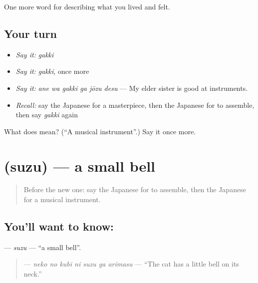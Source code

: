 \begin{grammarlens}[title={What you've built}]
One more word for describing what you lived and felt.
\end{grammarlens}

\subsection*{Your turn}
\begin{itemize}
\raggedright
  \item \emph{Say it:} \emph{gakki}
  \item \emph{Say it:} \emph{gakki}, once more
  \item \emph{Say it:} \emph{ane wa gakki ga jōzu desu} — My elder sister is good at instruments.
  \item \emph{Recall:} say the Japanese for a masterpiece, then the Japanese for to assemble, then say \emph{gakki} again
\end{itemize}

\begin{tcolorbox}[breakable,colback=teal!4,colframe=teal!35!black,title={Before you move on}]
What does  mean? (\textquotedblleft{}A musical instrument\textquotedblright{}.) Say it once more.
\end{tcolorbox}
\section[\texorpdfstring{\ja{すず} (suzu)}{すず (suzu)}]{ (suzu) — a small bell}

\label{lesson:JA-C469-suzu}



\begin{quote}
Before the new one: say the Japanese for to assemble, then the Japanese for a musical instrument.
\end{quote}

\subsection*{You'll want to know: }
\textbf{} — \emph{suzu} — \textquotedblleft{}a small bell\textquotedblright{}.

\begin{quote}
\textbf{   } — \emph{neko no kubi ni suzu ga arimasu} — \textquotedblleft{}The cat has a little bell on its neck.\textquotedblright{}
\end{quote}

